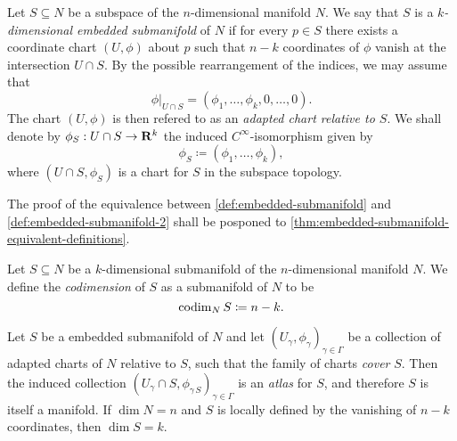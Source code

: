 \begin{definition}
    \label{def:embedded-submanifold-2}
    Let \(S \subseteq N\) be a subspace of the \(n\)-dimensional manifold \(N\). We
    say that \(S\) is a \emph{\(k\)-dimensional embedded submanifold} of \(N\) if
    for every \(p \in S\) there exists a coordinate chart \((U, \phi)\) about \(p\)
    such that \(n-k\) coordinates of \(\phi\) vanish at the intersection
    \(U \cap S\). By the possible rearrangement of the indices, we may assume that
    \[
        \phi|_{U \cap S} = (\phi_1, \dots, \phi_k, 0, \dots, 0).
    \]
    The chart \((U, \phi)\) is then refered to as an \emph{adapted chart relative to
        \(S\)}. We shall denote by \(\phi_S: U \cap S \to \mathbf{R}^k\) the induced
    \(C^{\infty}\)-isomorphism given by
    \[
        \phi_S \coloneq (\phi_1, \dots, \phi_k),
    \]
    where \((U \cap S, \phi_S)\) is a chart for \(S\) in the subspace topology.
\end{definition}

The proof of the equivalence between \cref{def:embedded-submanifold} and
\cref{def:embedded-submanifold-2} shall be posponed to
\cref{thm:embedded-submanifold-equivalent-definitions}.

\begin{definition}[Codimension]
    \label{def:codimension}
    Let \(S \subseteq N\) be a \(k\)-dimensional submanifold of the
    \(n\)-dimensional manifold \(N\). We define the \emph{codimension} of \(S\) as a
    submanifold of \(N\) to be
    \[
        \operatorname{codim}_N S \coloneq n - k.
    \]
\end{definition}

\begin{proposition}
    \label{prop:embedded-submanifold}
    Let \(S\) be a embedded submanifold of \(N\) and let
    \((U_{\gamma}, \phi_{\gamma})_{\gamma \in \Gamma}\) be a collection of adapted
    charts of \(N\) relative to \(S\), such that the family of charts \emph{cover}
    \(S\). Then the induced collection
    \((U_{\gamma} \cap S, \phi_{\gamma\, S})_{\gamma \in \Gamma}\) is an
    \emph{atlas} for \(S\), and therefore \(S\) is itself a manifold. If
    \(\dim N = n\) and \(S\) is locally defined by the vanishing of \(n-k\)
    coordinates, then \(\dim S = k\).
\end{proposition}

